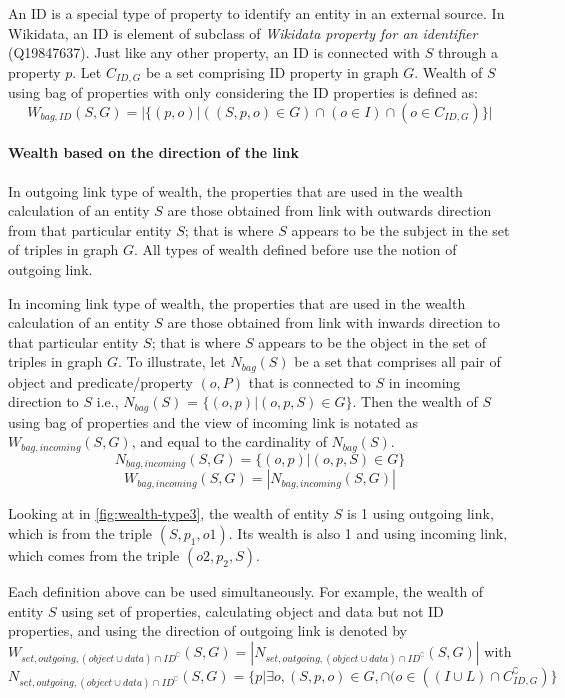 \documentclass[
]{ceurart}
\begin{document}
An ID is a special type of property to identify an entity in an external source. In Wikidata, an ID is element of subclass of \textit{Wikidata property for an identifier} (Q19847637). Just like any other property, an ID is connected with \(S\) through a property \(p\). Let  \(C_{ID,G}\) be a set comprising ID property in graph \(G\). Wealth of \(S\) using bag of properties with only considering the ID properties is defined as:
\[
    W_{bag, ID}(S, G) = |\{(p,o) | ((S, p, o) ∈ G) \cap (o ∈ I) \cap (o ∈ C_{ID,G})\}|
\]

\paragraph{Wealth based on the direction of the link}
In outgoing link type of wealth, the properties that are used in the wealth calculation of an entity \(S\) are those obtained from link with outwards direction from that particular entity \(S\); that is where \(S\) appears to be the subject in the set of triples in graph \(G\). All types of wealth defined before use the notion of outgoing link.

In incoming link type of wealth, the properties that are used in the wealth calculation of an entity \(S\) are those obtained from link with inwards direction to that particular entity \(S\); that is where \(S\) appears to be the object in the set of triples in graph \(G\). To illustrate, let \(N_{bag}(S)\) be a set that comprises all pair of object and predicate/property \((o,P)\) that is connected to \(S\) in incoming direction to \(S\) i.e., \(N_{bag}(S)\) = \(\{(o, p) | (o, p, S) ∈ G\}\). Then the wealth of \(S\) using bag of properties and the view of incoming link is notated as \(W_{bag, incoming}(S, G)\), and equal to the cardinality of \(N_{bag}(S)\).
\[
    N_{bag, incoming}(S, G) = \{(o,p) | (o, p, S) ∈ G\}
\]
\[
    W_{bag, incoming}(S, G) = |N_{bag, incoming}(S, G)|
\]

Looking at in \autoref{fig:wealth-type3}, the wealth of entity \(S\) is 1 using outgoing link, which is from the triple \((S, p_1, o1)\). Its wealth is also 1 and using incoming link, which comes from the triple \((o2, p_2, S)\).

Each definition above can be used simultaneously. For example, the wealth of entity \(S\) using set of properties, calculating object and data but not ID properties, and using the direction of outgoing link is denoted by \(W_{set, outgoing, (object \cup data) \cap ID^\complement}(S, G) = |N_{set, outgoing, (object \cup data) \cap ID^\complement}(S, G)|\) with \(N_{set, outgoing, (object \cup data) \cap ID^\complement}(S, G) = \{p | \exists o, (S, p, o) ∈ G, \cap (o ∈ ((I \cup L) \cap C_{ID,G}^\complement)\}\)
\end{document}
